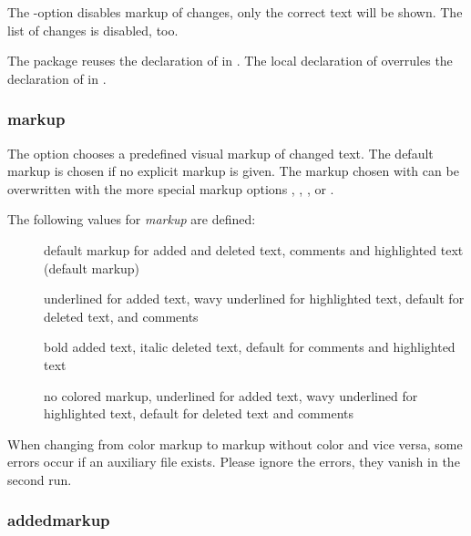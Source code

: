 
The -option disables markup of changes, only the correct text will be shown.
The list of changes is disabled, too.

The  package reuses the declaration of  in .
The local declaration of  overrules the declaration of  in .


\subsubsection{markup}


The  option chooses a predefined visual markup of changed text.
The default markup is chosen if no explicit markup is given.
The markup chosen with  can be overwritten with the more special markup options , , , or .

The following values for \emph{markup} are defined:

\begin{description}
	\item [] default markup for added and deleted text, comments and highlighted text (default markup)
	\item [] underlined for added text, wavy underlined for highlighted text, default for deleted text, and comments
	\item [] bold added text, italic deleted text, default for comments and highlighted text
	\item [] no colored markup, underlined for added text, wavy underlined for highlighted text, default for deleted text and comments
\end{description}


When changing from color markup to markup without color and vice versa, some errors occur if an auxiliary file exists.
Please ignore the errors, they vanish in the second run.

\subsubsection{addedmarkup}

